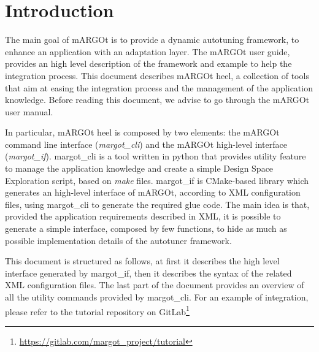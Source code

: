 \section{Introduction}


The main goal of mARGOt is to provide a dynamic autotuning framework, to enhance an application with an adaptation layer.
The mARGOt user guide, provides an high level description of the framework and example to help the integration process.
This document describes mARGOt heel, a collection of tools that aim at easing the integration process and the management of the application knowledge.
Before reading this document, we advise to go through the mARGOt user manual.


In particular, mARGOt heel is composed by two elements: the mARGOt command line interface (\textit{margot\_cli}) and the mARGOt high-level interface (\textit{margot\_if}).
margot\_cli is a tool written in python that provides utility feature to manage the application knowledge and create a simple Design Space Exploration script, based on \textit{make} files.
margot\_if is CMake-based library which generates an high-level interface of mARGOt, according to XML configuration files, using margot\_cli to generate the required glue code.
The main idea is that, provided the application requirements described in XML, it is possible to generate a simple interface, composed by few functions, to hide as much as possible implementation details of the autotuner framework.


This document is structured as follows, at first it describes the high level interface generated by margot\_if, then it describes the syntax of the related XML configuration files.
The last part of the document provides an overview of all the utility commands provided by margot\_cli.
For an example of integration, please refer to the tutorial repository on GitLab\footnote{\url{https://gitlab.com/margot_project/tutorial}}

